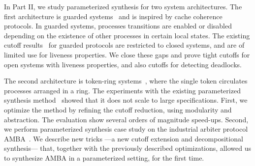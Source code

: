 In Part II, we study parameterized synthesis for two system architectures.
The first architecture is guarded systems~\cite{EmersonK03}
and is inspired by cache coherence protocols.
In guarded systems,
processes transitions are enabled or disabled depending on the existence of other processes in certain local states.
The existing cutoff results~\cite{EmersonK03} for guarded protocols
are restricted to closed systems, and are of limited use for liveness properties.
We close these gaps and prove tight cutoffs for open systems
with liveness properties, and also cutoffs for detecting deadlocks.

The second architecture is token-ring systems~\cite{Emerso03},
where the single token circulates processes arranged in a ring.
The experiments with the existing parameterized synthesis method~\cite{JB14}
showed that it does not scale to large specifications.
First, we optimize the method by refining the cutoff reduction,
using modularity and abstraction.
The evaluation show several orders of magnitude speed-ups.
Second, we perform parameterized synthesis case study on the industrial arbiter protocol AMBA~\cite{AMBAspec}.
We describe new tricks%
---a new cutoff extension and decompositional synthesis---%
that, together with the previously described optimizations, allowed us to synthesize AMBA
in a parameterized setting, for the first time.

